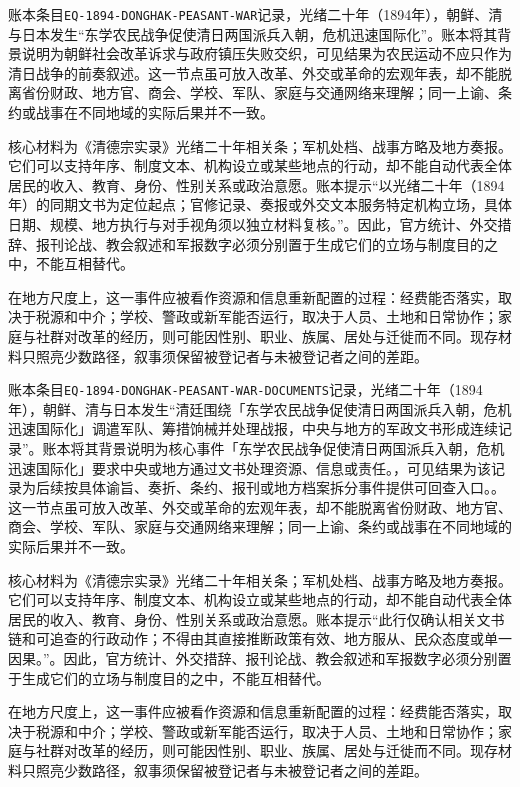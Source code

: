 账本条目\texttt{EQ-1894-DONGHAK-PEASANT-WAR}记录，光绪二十年（1894年），朝鲜、清与日本发生“东学农民战争促使清日两国派兵入朝，危机迅速国际化”。账本将其背景说明为朝鲜社会改革诉求与政府镇压失败交织，可见结果为农民运动不应只作为清日战争的前奏叙述。这一节点虽可放入改革、外交或革命的宏观年表，却不能脱离省份财政、地方官、商会、学校、军队、家庭与交通网络来理解；同一上谕、条约或战事在不同地域的实际后果并不一致。

核心材料为《清德宗实录》光绪二十年相关条；军机处档、战事方略及地方奏报。它们可以支持年序、制度文本、机构设立或某些地点的行动，却不能自动代表全体居民的收入、教育、身份、性别关系或政治意愿。账本提示“以光绪二十年（1894年）的同期文书为定位起点；官修记录、奏报或外交文本服务特定机构立场，具体日期、规模、地方执行与对手视角须以独立材料复核。”。因此，官方统计、外交措辞、报刊论战、教会叙述和军报数字必须分别置于生成它们的立场与制度目的之中，不能互相替代。

在地方尺度上，这一事件应被看作资源和信息重新配置的过程：经费能否落实，取决于税源和中介；学校、警政或新军能否运行，取决于人员、土地和日常协作；家庭与社群对改革的经历，则可能因性别、职业、族属、居处与迁徙而不同。现存材料只照亮少数路径，叙事须保留被登记者与未被登记者之间的差距。

账本条目\texttt{EQ-1894-DONGHAK-PEASANT-WAR-DOCUMENTS}记录，光绪二十年（1894年），朝鲜、清与日本发生“清廷围绕「东学农民战争促使清日两国派兵入朝，危机迅速国际化」调遣军队、筹措饷械并处理战报，中央与地方的军政文书形成连续记录”。账本将其背景说明为核心事件「东学农民战争促使清日两国派兵入朝，危机迅速国际化」要求中央或地方通过文书处理资源、信息或责任。，可见结果为该记录为后续按具体谕旨、奏折、条约、报刊或地方档案拆分事件提供可回查入口。。这一节点虽可放入改革、外交或革命的宏观年表，却不能脱离省份财政、地方官、商会、学校、军队、家庭与交通网络来理解；同一上谕、条约或战事在不同地域的实际后果并不一致。

核心材料为《清德宗实录》光绪二十年相关条；军机处档、战事方略及地方奏报。它们可以支持年序、制度文本、机构设立或某些地点的行动，却不能自动代表全体居民的收入、教育、身份、性别关系或政治意愿。账本提示“此行仅确认相关文书链和可追查的行政动作；不得由其直接推断政策有效、地方服从、民众态度或单一因果。”。因此，官方统计、外交措辞、报刊论战、教会叙述和军报数字必须分别置于生成它们的立场与制度目的之中，不能互相替代。

在地方尺度上，这一事件应被看作资源和信息重新配置的过程：经费能否落实，取决于税源和中介；学校、警政或新军能否运行，取决于人员、土地和日常协作；家庭与社群对改革的经历，则可能因性别、职业、族属、居处与迁徙而不同。现存材料只照亮少数路径，叙事须保留被登记者与未被登记者之间的差距。

